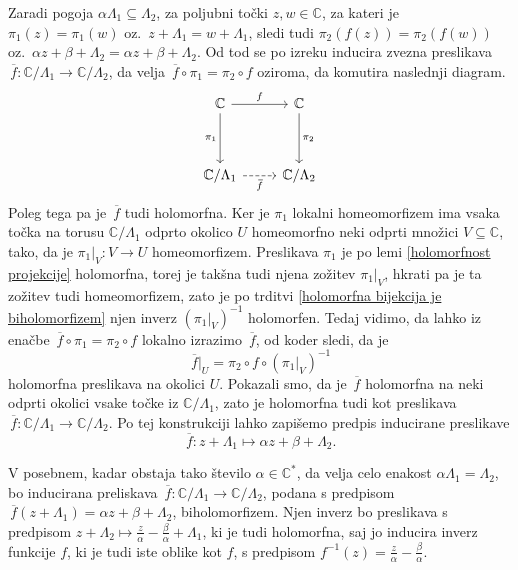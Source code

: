 \documentclass[mat1]{fmfdelo}
\numberwithin{equation}{section}
\newcommand{\C}{\mathbb C}
\newcommand{\CM}{\mathbb C ^*}
\newcommand{\inv}{^{-1}}
\newcommand{\olsi}[1]{\,\overline{\!{#1}}} %
\newcommand{\oz}{oz.\ }
\theoremstyle{definition}
\begin{document}
\begin{zgled*}
    Zaradi pogoja $\alpha\Lambda_1 \subseteq \Lambda_2$, za poljubni točki $z, w \in \C$, za kateri je $\pi_1(z) = \pi_1(w)$ \oz $z + \Lambda_1 = w + \Lambda_1$, sledi tudi $\pi_2(f(z)) = \pi_2(f(w))$ \oz $\alpha z + \beta + \Lambda_2 = \alpha z + \beta + \Lambda_2$.
    Od tod se po izreku \cite[trditev 3.22]{MrcunTop} inducira zvezna preslikava $\olsi{f} : \C/\Lambda_1 \to \C/\Lambda_2$, da velja $\olsi{f} \circ \pi_1 = \pi_2 \circ f$ oziroma, da komutira naslednji diagram.
    \[
        \begin{tikzcd}
            {\mathbb{C}} & {\mathbb{C}} \\
            \\
            {\mathbb{C}/\Lambda_1} & {\mathbb{C}/\Lambda_2}
            \arrow["f", from=1-1, to=1-2]
            \arrow["{\pi_2}", from=1-2, to=3-2]
            \arrow["{\pi_1}"', from=1-1, to=3-1]
            \arrow["{\olsi{f}}"', dashed, from=3-1, to=3-2]
        \end{tikzcd}
    \]
    Poleg tega pa je $\olsi{f}$ tudi holomorfna. Ker je $\pi_1$ lokalni homeomorfizem ima vsaka točka na torusu $\C/\Lambda_1$ odprto okolico $U$ homeomorfno neki odprti množici $V \subseteq \C$, tako, da je $\pi_1|_V : V \to U$ homeomorfizem. Preslikava $\pi_1$ je po lemi \ref{holomorfnost projekcije} holomorfna, torej je takšna tudi njena zožitev $\pi_1|_V$, hkrati pa je ta zožitev tudi homeomorfizem, zato je po trditvi \ref{holomorfna bijekcija je biholomorfizem} njen inverz $(\pi_1|_V)\inv$ holomorfen. Tedaj vidimo, da lahko iz enačbe $\olsi{f} \circ \pi_1 = \pi_2 \circ f$ lokalno izrazimo $\olsi{f}$, od koder sledi, da je 
    \[
        \olsi{f}|_U = \pi_2 \circ f \circ (\pi_1|_V)\inv
    \]
    holomorfna preslikava na okolici $U$. Pokazali smo, da je $\olsi{f}$ holomorfna na neki odprti okolici vsake točke iz $\C/\Lambda_1$, zato je holomorfna tudi kot preslikava $\olsi{f}: \C/\Lambda_1 \to \C/\Lambda_2$. Po tej konstrukciji lahko zapišemo predpis inducirane preslikave
    \[
        \olsi{f}: z + \Lambda_1 \mapsto \alpha z + \beta + \Lambda_2.  
    \]
\end{zgled*}

V posebnem, kadar obstaja tako število $\alpha \in \CM$, da velja celo enakost $\alpha\Lambda_1 = \Lambda_2$, bo inducirana preliskava $\olsi{f} : \C/\Lambda_1 \to \C/\Lambda_2$, podana s predpisom $\olsi{f}(z + \Lambda_1) = \alpha z + \beta + \Lambda_2$, biholomorfizem. Njen inverz bo preslikava s predpisom $z + \Lambda_2 \mapsto \frac{z}{\alpha} - \frac{\beta}{\alpha} + \Lambda_1$, ki je tudi holomorfna, saj jo inducira inverz funkcije $f$, ki je tudi iste oblike kot $f$, s predpisom $f\inv(z) = \frac{z}{\alpha} - \frac{\beta}{\alpha}$.
\end{document}
